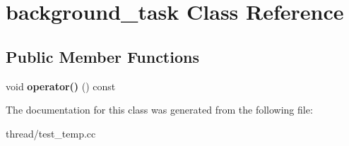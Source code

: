 \hypertarget{classbackground__task}{}\section{background\+\_\+task Class Reference}
\label{classbackground__task}
\subsection*{Public Member Functions}
\begin{DoxyCompactItemize}
\item 
\mbox{\label{classbackground__task_a116a774b35cf02ea68022f0be37f2ce9}} 
void {\bfseries operator()} () const
\end{DoxyCompactItemize}


The documentation for this class was generated from the following file\+:\begin{DoxyCompactItemize}
\item 
thread/test\+\_\+temp.\+cc\end{DoxyCompactItemize}
